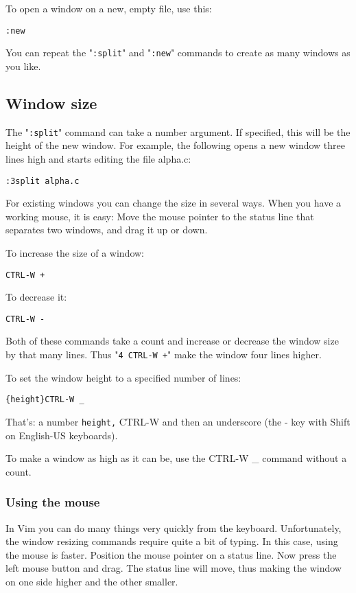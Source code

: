 To open a window on a new, empty file, use this:

 \begin{Verbatim}[samepage=true]
 :new
 \end{Verbatim}

You can repeat the "\texttt{:split}" and "\texttt{:new}" commands to create as many windows as you like.

\subsection{Window size}
The "\texttt{:split}" command can take a number argument.
If specified, this will be the height of the new window.
For example, the following opens a new window three lines high and starts editing the file alpha.c:

 \begin{Verbatim}[samepage=true]
 :3split alpha.c
 \end{Verbatim}

For existing windows you can change the size in several ways.
When you have a working mouse, it is easy: Move the mouse pointer to the status line that separates two windows, and drag it up or down.

To increase the size of a window:

 \begin{Verbatim}[samepage=true]
 CTRL-W +
 \end{Verbatim}

To decrease it:

 \begin{Verbatim}[samepage=true]
 CTRL-W -
 \end{Verbatim}

Both of these commands take a count and increase or decrease the window size by that many lines.
Thus "\texttt{4 CTRL-W +}" make the window four lines higher.

To set the window height to a specified number of lines:

 \begin{Verbatim}[samepage=true]
 {height}CTRL-W _
 \end{Verbatim}

That's: a number \texttt{{height},} CTRL-W and then an underscore (the - key with Shift on English-US keyboards).

To make a window as high as it can be, use the CTRL-W \_ command without a count.

\subsubsection{Using the mouse}
In Vim you can do many things very quickly from the keyboard.
Unfortunately, the window resizing commands require quite a bit of typing.
In this case, using the mouse is faster.
Position the mouse pointer on a status line.
Now press the left mouse button and drag.
The status line will move, thus making the window on one side higher and the other smaller.

